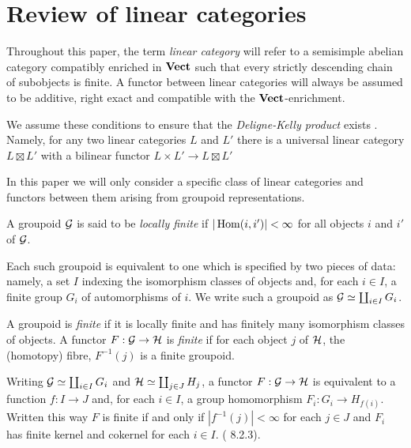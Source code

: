 \section{Review of linear categories}
\label{LinCats}

Throughout this paper, the term {\em linear category} will refer to a semisimple abelian category compatibly enriched in $\mathbf{Vect}$ such that every strictly descending chain of subobjects is finite. A functor between linear categories will always be assumed to be additive, right exact and compatible with the $\mathbf{Vect}$-enrichment. 
\begin{Remark}
We assume these conditions to ensure that the {\em Deligne-Kelly product} exists \cite{Franco}. Namely, for any two linear categories $L$ and $L'$ there is a universal linear category $L \boxtimes L'$ with a bilinear functor $L \times L' \to L \boxtimes L'$ 
\end{Remark}

In this paper we will only consider a specific class of linear categories and functors between them arising from groupoid representations. 

\begin{Definition}
A groupoid $\mathcal{G}$ is said to be {\em locally finite} if $|\operatorname{Hom}(i,i')| < \infty$ for all objects $i$ and $i'$ of $\mathcal{G}$. 
\end{Definition}

Each such groupoid is equivalent to one which is specified by two pieces of data: namely, a set $I$ indexing the isomorphism classes of objects and, for each $i \in I$, a finite group $G_i$ of automorphisms of $i$. We write such a groupoid as $\mathcal{G} \simeq \coprod_{i \in I} G_i$.


\begin{Definition}
A groupoid is {\em finite} if it is locally finite and has finitely many isomorphism classes of objects. A functor $F: \mathcal{G} \to \mathcal{H}$ is {\em finite} if for each object $j$ of $\mathcal{H}$, the (homotopy) fibre, $F^{-1}(j)$ is a finite groupoid.
\end{Definition}

Writing $\mathcal{G} \simeq \coprod_{i \in I} G_i$ and $\mathcal{H} \simeq \coprod_{j \in J} H_j$, a functor $F: \mathcal{G} \to \mathcal{H}$ is equivalent to a function $f:I \to J$ and, for each $i \in I$, a group homomorphism $F_i: G_i \to H_{f(i)}$. Written this way $F$ is finite if and only if $|f^{-1}(j)| < \infty$ for each $j \in J$ and $F_i$ has finite kernel and cokernel for each $i \in I$. (\cite{KapranovDyckerhoff} 8.2.3).

